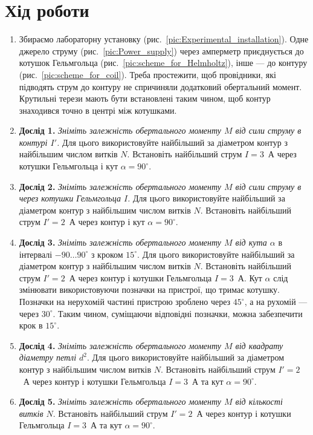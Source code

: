 \documentclass{LabWork}
\begin{document}
\section{Хід роботи}

\begin{enumerate}
	\item Збираємо лабораторну установку (рис.~\ref{pic:Experimental_installation}). Одне джерело струму (рис.~\ref{pic:Power_supply}) через амперметр приєднується до котушок Гельмгольца (рис.~\ref{pic:scheme_for_Helmholtz}), інше --- до контуру (рис.~\ref{pic:scheme_for_coil}). Треба простежити, щоб провідники, які підводять струм до контуру не спричиняли додатковий обертальний момент. Крутильні терези мають бути встановлені таким чином, щоб контур знаходився точно в центрі між котушками.
	\item \textbf{Дослід 1.} \emph{Зніміть залежність обертального моменту $M$ від сили струму в контурі $I'$.} Для цього використовуйте найбільший за діаметром контур з найбільшим числом витків $N$. Встановіть найбільший струм $I = 3$~А через котушки Гельмгольца і кут $\alpha = 90^\circ$.
	\item \textbf{Дослід 2.}  \emph{Зніміть залежність обертального моменту $M$ від сили струму в через котушки Гельмгольца $I$.} Для цього використовуйте найбільший за діаметром контур з найбільшим числом витків $N$. Встановіть найбільший струм $I' = 2$~А через контур і кут $\alpha = 90^\circ$.
	\item \textbf{Дослід 3.} \emph{Зніміть залежність обертального моменту $M$ від кута $\alpha$} в інтервалі $-90\ldots 90^\circ$ з кроком $15^\circ$.  Для цього використовуйте найбільший за діаметром контур з найбільшим числом витків $N$. Встановіть найбільший струм $I' = 2$~А через контур і котушки Гельмгольца $I = 3$~А. Кут $\alpha$ слід змінювати використовуючи позначки на пристрої, що тримає котушку. Позначки на нерухомій частині пристрою зроблено через $45^\circ$, а на рухомій --- через $30^\circ$. Таким чином, суміщаючи відповідні позначки, можна забезпечити крок в  $15^\circ$.
	\item \textbf{Дослід 4.} \emph{Зніміть залежність обертального моменту $M$ від квадрату діаметру петлі $d^2$}. Для цього використовуйте найбільший за діаметром контур з найбільшим числом витків $N$. Встановіть найбільший струм $I' = 2$~А через контур і котушки Гельмгольца $I = 3$~А та кут $\alpha = 90^\circ$.
	\item \textbf{Дослід 5.} \emph{Зніміть залежність обертального моменту $M$ від кількості витків $N$}.  Встановіть найбільший струм $I' = 2$~А через контур і котушки Гельмгольца $I = 3$~А та кут $\alpha = 90^\circ$.
\end{enumerate}
\end{document}
